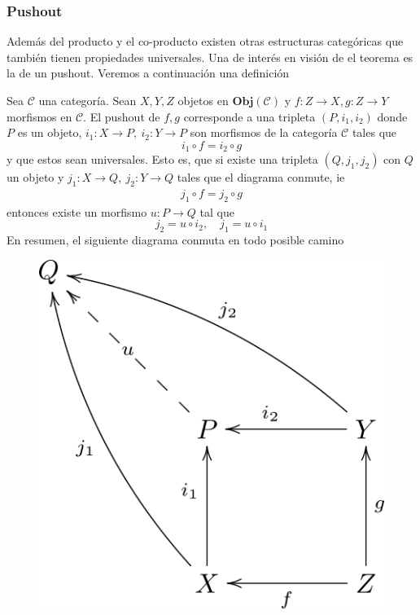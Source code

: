 \subsubsection{Pushout}
Además del producto y el co-producto existen otras estructuras
categóricas que también tienen propiedades universales. Una de interés
en visión de el teorema \vank es la de un pushout. Veremos a
continuación una definición
\begin{definicion}[Pushout]
Sea \(\mathscr{C}\) una categoría. Sean \(X,Y,Z\) objetos en
\(\mathbf{Obj}(\mathscr{C})\) y \(f : Z \to X , g : Z \to Y\) morfismos
en \(\mathscr{C}\). El pushout de \(f,g\) corresponde a una tripleta
\((P, i_1, i_2)\) donde \(P\) es un objeto, \(i_1 : X \to P ,\ i_2 : Y
\to P\) son morfismos de la categoría \(\mathscr{C}\) tales que
\[ i_1 \circ f = i_2 \circ g\]
y que estos sean universales. Esto es, que si existe una tripleta \((Q,
j_1, j_2)\) con \(Q\) un objeto y \(j_1 : X \to Q,\ j_2 : Y \to Q\)
tales que el diagrama conmute, ie
\begin{gather*}
  j_1 \circ f = j_2 \circ g
\end{gather*}
entonces existe un morfismo \(u : P \to Q\) tal que
\[ j_2 = u \circ i_2, \quad j_1 = u \circ i_1 \]
En resumen, el siguiente diagrama conmuta en todo posible camino
\begin{figure}[h]
    \centering \includegraphics[scale=1]{./imagenes/pushout.png}
\end{figure}
\end{definicion}

